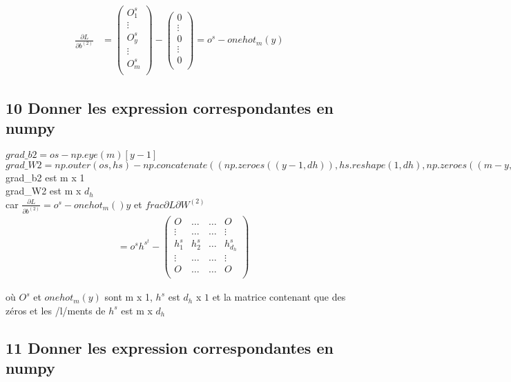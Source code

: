 \documentclass[12pt]{article}
\begin{document}
\begin{align*} 
    \frac{\partial L}{\partial b^{(2)}}
&=
     \left(
       \begin{array}{r}
         O_1^s\\
        \vdots \\
         O_y^s\\
	\vdots\\
	O_m^s\\
       \end{array}
      \right)  - 
	\left(
     \begin{array}{r}
         0\\
        \vdots \\
         0\\
	\vdots\\
	0\\
       \end{array}
     \right)=o^s-onehot_m(y)
\end{align*}

 \subsection{10 Donner les expression correspondantes en numpy}
$grad\_b2 = os - np.eye(m)[y-1]$\\
$grad\_W2 = np.outer(os,hs)-np.concatenate((np.zeroes((y-1,dh)),hs.reshape(1,dh),np.zeroes((m-y,dh))))$\\

grad\_b2 est m x 1\\
grad\_W2 est m x $d_h$\\

car $\frac{\partial L}{\partial b^{(2)}} = o^s-onehot_m()y$ et $frac{\partial L}{\partial W^{(2)}}$ \\


\begin{align*} 
&= o^sh^{s^t} - 
	\left(
     \begin{array}{rrrr}
         O &   \dots &   \dots &   O\\
        \vdots &  \dots &   \dots&   \vdots \\
         h_1^s & h_2^s & \dots &h_{d_h}^s \\
 	\vdots &  \dots &   \dots&   \vdots \\
	O &   \dots &   \dots &   O\\
       \end{array}
     \right)
\end{align*}

où $O^s$ et $onehot_m(y)$ sont m x 1, $h^s$ est $d_h$ x $1$ et la matrice contenant que des zéros et les /l/ments de $h^s$ est m x $d_h$

 \subsection{11 Donner les expression correspondantes en numpy}
\end{document}
